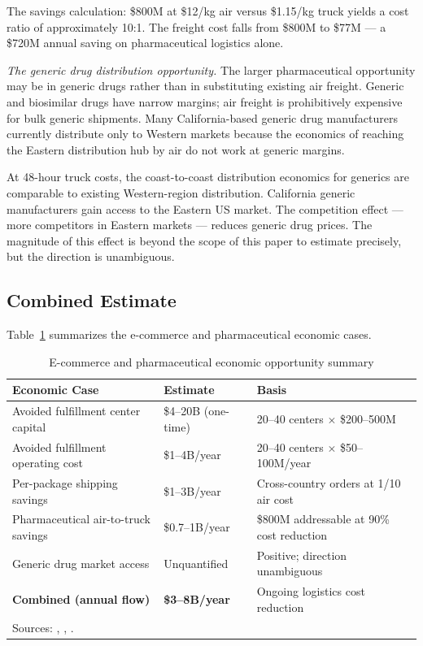 The savings calculation: \$800M at \$12/kg air versus \$1.15/kg truck yields a
cost ratio of approximately 10:1. The freight cost falls from \$800M to \$77M ---
a \$720M annual saving on pharmaceutical logistics alone.

\textit{The generic drug distribution opportunity.} The larger pharmaceutical opportunity
may be in generic drugs rather than in substituting existing air freight. Generic and
biosimilar drugs have narrow margins; air freight is prohibitively expensive for
bulk generic shipments. Many California-based generic drug manufacturers currently
distribute only to Western markets because the economics of reaching the Eastern
distribution hub by air do not work at generic margins.

At 48-hour truck costs, the coast-to-coast distribution economics for generics are
comparable to existing Western-region distribution. California generic manufacturers
gain access to the Eastern US market. The competition effect --- more competitors in
Eastern markets --- reduces generic drug prices. The magnitude of this effect is
beyond the scope of this paper to estimate precisely, but the direction is unambiguous.

\subsection{Combined Estimate}

Table~\ref{tab:ecommerce_pharma} summarizes the e-commerce and pharmaceutical economic
cases.

\begin{table}[h]
\centering
\caption{E-commerce and pharmaceutical economic opportunity summary}
\label{tab:ecommerce_pharma}
\begin{tabular}{lll}
\toprule
Economic Case & Estimate & Basis \\
\midrule
Avoided fulfillment center capital  & \$4--20B (one-time) & 20--40 centers $\times$ \$200--500M \\
Avoided fulfillment operating cost  & \$1--4B/year & 20--40 centers $\times$ \$50--100M/year \\
Per-package shipping savings        & \$1--3B/year & Cross-country orders at 1/10 air cost \\
Pharmaceutical air-to-truck savings & \$0.7--1B/year & \$800M addressable at 90\% cost reduction \\
Generic drug market access          & Unquantified & Positive; direction unambiguous \\
\midrule
\textbf{Combined (annual flow)}     & \textbf{\$3--8B/year} & Ongoing logistics cost reduction \\
\bottomrule
\multicolumn{3}{l}{\footnotesize Sources: \citet{FHWA_freight2023}, \citet{PhRMA2023}, \citet{BTS_airfreight2023}.} \\
\end{tabular}
\end{table}

